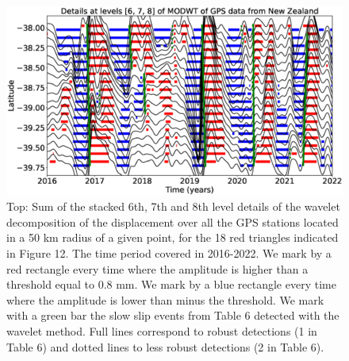 \documentclass{article}
\begin{document}
\begin{figure}
\noindent\includegraphics[width=\textwidth, trim={0cm 0cm 0cm 0cm},clip]{figures/GPS_NZ_details_6-7-8_2016-2022.eps}
\caption{Top: Sum of the stacked 6th, 7th and 8th level details of the wavelet decomposition of the displacement over all the GPS stations located in a 50 km radius of a given point, for the 18 red triangles indicated in Figure 12. The time period covered in 2016-2022. We mark by a red rectangle every time where the amplitude is higher than a threshold equal to 0.8 mm. We mark by a blue rectangle every time where the amplitude is lower than minus the threshold. We mark with a green bar the slow slip events from Table 6 detected with the wavelet method. Full lines correspond to robust detections (1 in Table 6) and dotted lines to less robust detections (2 in Table 6).}
\label{pngfiguresample}
\end{figure}
\end{document}
